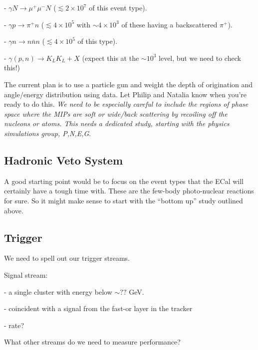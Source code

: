- $\gamma N \rightarrow  \mu^+\mu^- N$ ($\lesssim 2 \times 10^7$ of this event type). 

- $\gamma p \rightarrow \pi^+ n$ ($\lesssim 4\times 10^5$ with $\sim 4\times 10^3$ of these having a backscattered $\pi^+$). 

- $\gamma n \rightarrow n \bar{n} n$ ($\lesssim 4\times 10^5$ of this type). 

- $\gamma (p,n) \rightarrow K_L K_L + X$ (expect this at the $\sim 10^3$ level, but we need to check this!)

The current plan is to use a particle gun and weight the depth of origination and angle/energy distribution using data. Let Philip and Natalia know when you're ready to do this. 
{\it We need to be especially careful to include the regions of phase space where the MIPs are soft or wide/back scattering by recoiling off the nucleons or atoms. This needs a dedicated study, starting with the physics simulations group, P,N,E,G}. 


\subsection{Hadronic Veto System}

A good starting point would be to focus on the event types that the ECal will certainly have a tough time with. These are the few-body photo-nuclear reactions for sure. So it might make sense to start with the ``bottom up'' study outlined above. 

\subsection{Trigger}

We need to spell out our trigger streams. 

Signal stream: 

- a single cluster with energy below $\sim ??$ GeV. 

- coincident with a signal from the fast-or layer in the tracker

- rate? 

What other streams do we need to measure performance? 
